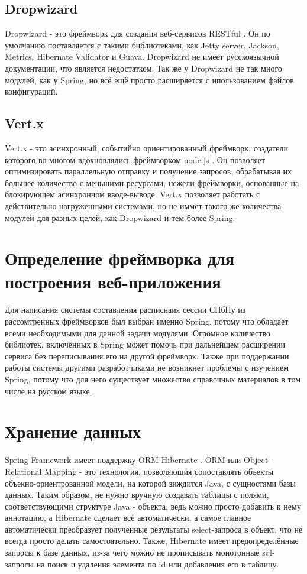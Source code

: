 \subsection{Dropwizard}
Dropwizard - это фреймворк для создания веб-сервисов RESTful \cite{dropwizard}. Он по умолчанию поставляется с такими библиотеками, как Jetty server, Jackson, Metrics, Hibernate Validator и Guava. Dropwizard не имеет русскоязычной документации, что является недостатком. Так же у Dropwizard не так много модулей, как у Spring, но всё ещё просто расширяется с ипользованием файлов конфигураций.

\subsection{Vert.x}
Vert.x - это асинхронный, событийно ориентированный фреймворк, создатели которого во многом вдохновлялись фреймворком node.js \cite{vertx}. Он позволяет оптимизировать параллельную отправку и получение запросов, обрабатывая их большее количество с меньшими ресурсами, нежели фреймворки, основанные на блокирующем асинхронном вводе-выводе. Vert.x позволяет работать с действительно нагруженными системами, но не иммет такого же количества модулей для разных целей, как Dropwizard и тем более Spring.

\section{Определение фреймворка для построения веб-приложения} 
Для написания системы составления расписнаия сессии СПбПу из рассомтренных фреймворков был выбран именно Spring, потому что обладает всеми необходимыми для данной задачи модулями. Огромное количество библиотек, включённых в Spring может помочь при дальнейшем расширении сервиса без переписывания его на другой фреймворк. Также при поддержании работы системы другими разработчиками не возникнет проблемы с изучением Spring, потому что для него существует множество справочных материалов в том числе на русском языке.

\section{Хранение данных} \label{ch3:sec3}
Spring Framework имеет поддержку ORM Hibernate \cite{hibernate}. ORM или Object-Relational Mapping - это технология, позволяющия сопоставлять объекты объекно-ориентрованной модели, на которой зиждится Java, с сущностями базы данных. Таким образом, не нужно вручную создавать таблицы с полями, соответствующими структуре Java - объекта, ведь можно просто добавить к нему аннотацию, а Hibernate сделает всё автоматически, а самое главное автоматически преобразует полученные результаты select-запроса в объект, что не всегда просто делать самостоятельно. Также, Hibernate имеет предопределённые запросы к базе данных, из-за чего можно не прописывать монотонные sql-запросы на поиск и удаления элемента по id или добавления его в таблицу.

